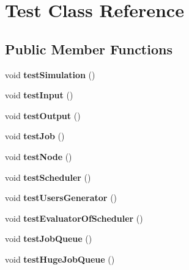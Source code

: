 \hypertarget{class_test}{}\section{Test Class Reference}
\label{class_test}
\subsection*{Public Member Functions}
\begin{DoxyCompactItemize}
\item 
\mbox{\label{class_test_a97d77dce48bd99f1af0a5c3a8be8b435}} 
void {\bfseries test\+Simulation} ()
\item 
\mbox{\label{class_test_a4901403f34d65327a6fcb50b4b4387d3}} 
void {\bfseries test\+Input} ()
\item 
\mbox{\label{class_test_a4a184aa153f2df4f4840fffed926cba5}} 
void {\bfseries test\+Output} ()
\item 
\mbox{\label{class_test_a0c0a7237b36e554b70393e9a9afb0827}} 
void {\bfseries test\+Job} ()
\item 
\mbox{\label{class_test_a6c89d0a52d3737d13e7d7d559795f7f0}} 
void {\bfseries test\+Node} ()
\item 
\mbox{\label{class_test_a153995343cf614c7196b3d64621ae62e}} 
void {\bfseries test\+Scheduler} ()
\item 
\mbox{\label{class_test_a9bd9be841180b6597b709bba9b057e90}} 
void {\bfseries test\+Users\+Generator} ()
\item 
\mbox{\label{class_test_ae2a4a763ae3e91b6c4b3dc21eaa84e08}} 
void {\bfseries test\+Evaluator\+Of\+Scheduler} ()
\item 
\mbox{\label{class_test_a8ead44ebf288f773db2497712989286b}} 
void {\bfseries test\+Job\+Queue} ()
\item 
\mbox{\label{class_test_ad556a698bd0eb5c9717d8c3e1143369b}} 
void {\bfseries test\+Huge\+Job\+Queue} ()
\item 

\end{DoxyCompactItemize}
